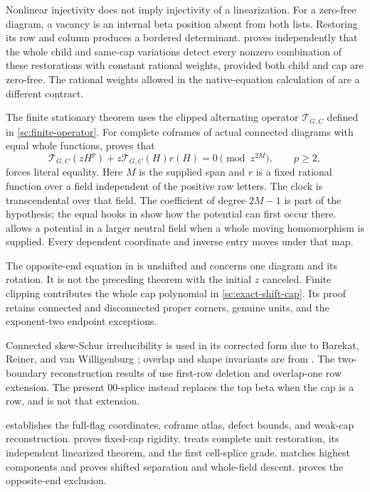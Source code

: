 \documentclass[11pt,a4paper]{amsart}
\numberwithin{equation}{section}
\theoremstyle{plain}
\theoremstyle{definition}
\begin{document}
Nonlinear injectivity does not imply injectivity of a linearization.
For a zero-free diagram, a vacancy is an internal beta position absent
from both lists.  Restoring its row and column produces a bordered
determinant.   proves independently that the whole
child and same-cap variations detect every nonzero combination of these
restorations with constant rational weights, provided both child and cap
are zero-free.  The rational weights allowed in the native-equation
calculation of  are a different contract.

The finite stationary theorem uses the clipped alternating operator
\(\mathcal T_{G,C}\) defined in \eqref{sc:finite-operator}.  For complete
coframes of actual connected diagrams with equal whole functions,
 proves that
\[
 \mathcal T_{G,C}(zH^p)+z\mathcal T_{G,C}(H)r(H)
                  =0\pmod{z^{2M}},\qquad p\ge2,
\]
forces literal equality.  Here \(M\) is the supplied span and \(r\) is a
fixed rational function over a field independent of the positive raw
letters.  The clock is transcendental over that field.  The coefficient
of degree \(2M-1\) is part of the hypothesis; the equal hooks in
 show how the potential can first occur there.
 allows a potential in a larger neutral
field when a whole moving homomorphism is supplied.  Every dependent
coordinate and inverse entry moves under that map.

The opposite-end equation in  is unshifted
and concerns one diagram and its rotation.  It is not the preceding
theorem with the initial \(z\) canceled.  Finite clipping contributes the
whole cap polynomial in \eqref{sc:exact-shift-cap}.  Its proof retains
connected and disconnected proper corners, genuine units, and the
exponent-two endpoint exceptions.

Connected skew-Schur irreducibility is used in its corrected form due to
Barekat, Reiner, and van Willigenburg
\cite{Barekat2009CoincidencesCorrigendum}; overlap and shape invariants are
from \cite{Reiner2007Coincidences}.  The two-boundary reconstruction results
of \cite{Shields2026SkewSchur} use first-row deletion and overlap-one row
extension.  The present \(00\)-splice instead replaces the top beta when
the cap is a row, and is not that extension.

 establishes the full-flag coordinates,
coframe atlas, defect bounds, and weak-cap reconstruction.
 proves fixed-cap rigidity.
 treats complete unit restoration, its
independent linearized theorem, and the first cell-splice grade.
 matches highest components and proves shifted
separation and whole-field descent.   proves the
opposite-end exclusion.
\end{document}
